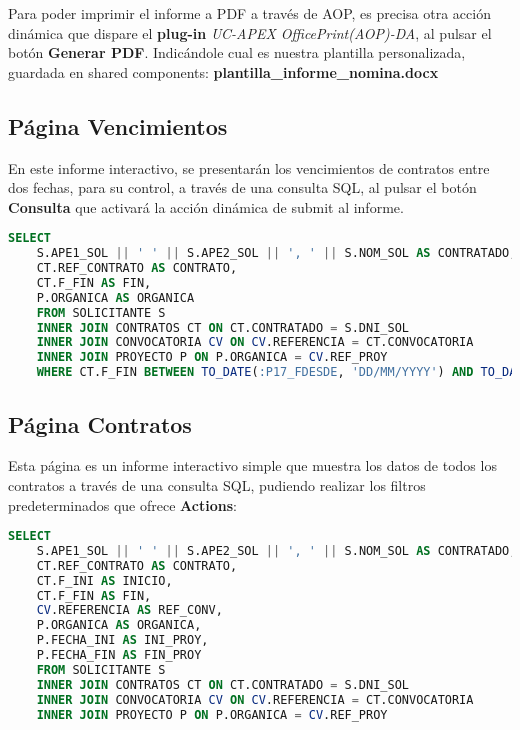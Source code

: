 Para poder imprimir el informe a PDF a través de \acrfull{AOP}, es precisa otra acción dinámica que dispare el \textbf{plug-in} \textit{UC-APEX OfficePrint(AOP)-DA}, al pulsar el botón \textbf{Generar PDF}. Indicándole cual es nuestra plantilla personalizada, guardada en shared components: \textbf{plantilla\_informe\_nomina.docx}

\subsection{Página Vencimientos}
En este informe interactivo, se presentarán los vencimientos de contratos entre dos fechas, para su control, a través de una consulta \acrshort{SQL}, al pulsar el botón \textbf{Consulta} que activará la acción dinámica de submit al informe.
\begin{lstlisting}[language=SQL, caption={Muetra de contratatos que vencen en periodo de fechas}]
	SELECT 
	S.APE1_SOL || ' ' || S.APE2_SOL || ', ' || S.NOM_SOL AS CONTRATADO,
	CT.REF_CONTRATO AS CONTRATO, 
	CT.F_FIN AS FIN,
	P.ORGANICA AS ORGANICA
	FROM SOLICITANTE S
	INNER JOIN CONTRATOS CT ON CT.CONTRATADO = S.DNI_SOL
	INNER JOIN CONVOCATORIA CV ON CV.REFERENCIA = CT.CONVOCATORIA
	INNER JOIN PROYECTO P ON P.ORGANICA = CV.REF_PROY
	WHERE CT.F_FIN BETWEEN TO_DATE(:P17_FDESDE, 'DD/MM/YYYY') AND TO_DATE(:P17_FHASTA, 'DD/MM/YYYY')
\end{lstlisting}

\subsection{Página Contratos}
Esta página es un informe interactivo simple que muestra los datos de todos los contratos a través de una consulta \acrshort{SQL}, pudiendo realizar los filtros predeterminados que ofrece \textbf{Actions}:
\begin{lstlisting}[language=SQL, caption={Consulta para todos los contratos}]
	SELECT 
	S.APE1_SOL || ' ' || S.APE2_SOL || ', ' || S.NOM_SOL AS CONTRATADO,
	CT.REF_CONTRATO AS CONTRATO, 
	CT.F_INI AS INICIO, 
	CT.F_FIN AS FIN,
	CV.REFERENCIA AS REF_CONV,  
	P.ORGANICA AS ORGANICA, 
	P.FECHA_INI AS INI_PROY, 
	P.FECHA_FIN AS FIN_PROY
	FROM SOLICITANTE S
	INNER JOIN CONTRATOS CT ON CT.CONTRATADO = S.DNI_SOL
	INNER JOIN CONVOCATORIA CV ON CV.REFERENCIA = CT.CONVOCATORIA
	INNER JOIN PROYECTO P ON P.ORGANICA = CV.REF_PROY
\end{lstlisting}
